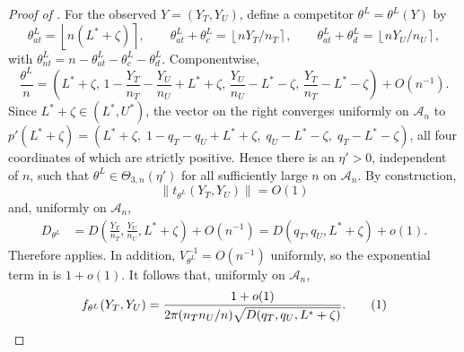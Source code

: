 \documentclass[12pt,reqno]{amsart}
\begin{document}
\begin{proof}[Proof of ]
{For the observed \(Y=(Y_T,Y_U)\), define a competitor
\(\theta^L=\theta^L(Y)\) by
\[
\theta^L_{at}=\left\lfloor n(L^*+\zeta)\right\rceil,\qquad
\theta^L_{at}+\theta^L_c=\left\lfloor nY_T/n_T\right\rceil,\qquad
\theta^L_{at}+\theta^L_d=\left\lfloor nY_U/n_U\right\rceil,
\]
with \(\theta^L_{nt}=n-\theta^L_{at}-\theta^L_c-\theta^L_d\).  Componentwise,
\[
\frac{\theta^L}{n}
=
\left(
L^*+\zeta,\,
1-\frac{Y_T}{n_T}-\frac{Y_U}{n_U}+L^*+\zeta,\,
\frac{Y_U}{n_U}-L^*-\zeta,\,
\frac{Y_T}{n_T}-L^*-\zeta
\right)
+O(n^{-1}).
\]
Since \(L^*+\zeta\in(L^*,U^*)\), the vector on the right converges uniformly
on \(\mathcal A_n\) to \(p'(L^*+\zeta) = \left(
L^*+\zeta,\;
1-q_T-q_U+L^*+\zeta,\;
q_U-L^*-\zeta,\;
q_T-L^*-\zeta
\right)\), all four coordinates of which are
strictly positive.  Hence there is an \(\eta'>0\), independent of \(n\), such
that \(\theta^L\in\Theta_{3,n}(\eta')\) for all sufficiently large \(n\) on
\(\mathcal A_n\).  By construction, 
\[
\|t_{\theta^L}(Y_T,Y_U)\|=O(1)
\]
and, uniformly on \(\mathcal A_n\),
\[
\begin{aligned}
D_{\theta^L}
&=
D\left(\frac{Y_T}{n_T},\frac{Y_U}{n_U},L^*+\zeta\right)+O(n^{-1})=
D(q_T,q_U,L^*+\zeta)+o(1).
\end{aligned}
\]
Therefore  applies.  In addition,
\(V_{\theta^L}^{-1}=O(n^{-1})\) uniformly, so the exponential term in
 is \(1+o(1)\).  It follows that, uniformly on
\(\mathcal A_n\),
\[
f_{\theta^L}(Y_T,Y_U)
=
\frac{1+o(1)}
{2\pi(n_Tn_U/n)\sqrt{D(q_T,q_U,L^*+\zeta)}}. \numberthis
\label{eq:lower-comp-unified}
\]}


\end{proof}
\end{document}
